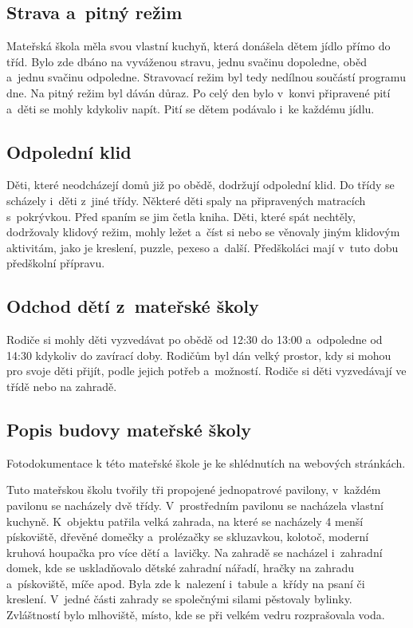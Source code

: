 		\subsection{Strava a~pitný režim}
			Mateřská škola měla svou vlastní kuchyň, která donášela dětem jídlo přímo do tříd. Bylo zde dbáno na vyváženou stravu, jednu svačinu dopoledne, oběd a~jednu svačinu odpoledne. Stravovací režim byl tedy nedílnou součástí programu dne. Na pitný režim byl dáván důraz. Po celý den bylo v~konvi připravené pití a~děti se mohly kdykoliv napít. Pití se dětem podávalo i~ke každému jídlu.

		\subsection{Odpolední klid}
			Děti, které neodcházejí domů již po obědě, dodržují odpolední klid. Do třídy se scházely i~děti z~jiné třídy. Některé děti spaly na připravených matracích s~pokrývkou. Před spaním se jim četla kniha. Děti, které spát nechtěly, dodržovaly klidový režim, mohly ležet a~číst si nebo se věnovaly jiným klidovým aktivitám, jako je kreslení, puzzle, pexeso a~další. Předškoláci mají v tuto dobu předškolní přípravu. 


		\subsection{Odchod dětí z~mateřské školy}
			Rodiče si mohly děti vyzvedávat po obědě od 12:30 do 13:00 a~odpoledne od 14:30 kdykoliv do zavírací doby. Rodičům byl dán velký prostor, kdy si mohou pro svoje děti přijít, podle jejich potřeb a~možností. Rodiče si děti vyzvedávají ve třídě nebo na zahradě. 

		\subsection{Popis budovy mateřské školy}
			Fotodokumentace k této mateřské škole je ke shlédnutích na webových stránkách.

			Tuto mateřskou školu tvořily tři propojené jednopatrové pavilony, v~každém pavilonu se nacházely dvě třídy. V~prostředním pavilonu se nacházela vlastní kuchyně. K~objektu patřila velká zahrada, na které se nacházely 4 menší pískoviště, dřevěné domečky a~prolézačky se skluzavkou, kolotoč, moderní kruhová houpačka pro více dětí a~lavičky. Na zahradě se nacházel i~zahradní domek, kde se uskladňovalo dětské zahradní nářadí, hračky na zahradu a~pískoviště, míče apod. Byla zde k~nalezení i~tabule a~křídy na psaní či kreslení. V~jedné části zahrady se společnými silami pěstovaly bylinky. Zvláštností bylo mlhoviště, místo, kde se při velkém vedru rozprašovala voda. 

